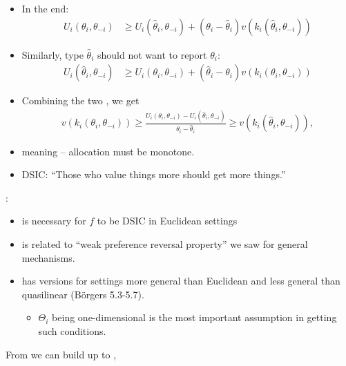 \documentclass[english]{beamer}		%
\def\lyxframeend{} %
\begin{document}
\begin{itemize}
	\item In the end:
	\vspace{-0.5em}\begin{align*}
		U_i(\theta_i, \theta_{-i}) &\geq U_i(\hat{\theta}_i, \theta_{-i}) + \left(\theta_i - \hat{\theta}_i \right) v \left( k_i(\hat{\theta}_i,\theta_{-i}) \right)
	\end{align*}\vspace{-1em}
	\item Similarly, type $\hat{\theta}_i$ should not want to report $\theta_i$:
	\vspace{-0.5em}\begin{align*}
		U_i(\hat{\theta}_i, \theta_{-i}) &\geq U_i(\theta_i, \theta_{-i}) + \left(\hat{\theta}_i - \theta_i \right) v \left( k_i(\theta_i,\theta_{-i}) \right)
	\end{align*}\vspace{-1em}
	\pause
	\item Combining the two , we get
	{\small \vspace{-0.5em}\begin{align*}
		v \left( k_i(\theta_i,\theta_{-i}) \right) 
		\geq 
		\frac{ U_i(\theta_i, \theta_{-i}) - U_i(\hat{\theta}_i, \theta_{-i}) }{ \theta_i - \hat{\theta}_i } 
		\geq 
		v \left( k_i(\hat{\theta}_i,\theta_{-i}) \right),
	\end{align*}\vspace{-1em}}
	\pause
	\item meaning  -- allocation must be \alert{monotone}.
	\item DSIC: ``Those who value things more should get more things.''
	\vspace{-2em}
\end{itemize}
\lyxframeend


:
\begin{itemize}
	\item is necessary for $f$ to be DSIC in Euclidean settings
	\item is related to ``weak preference reversal property'' we saw for general mechanisms.
	\item has versions for settings more general than Euclidean and less general than quasilinear (B{\"o}rgers 5.3-5.7).
	\begin{itemize}
		\item $\Theta_i$ being one-dimensional is the most important assumption in getting such conditions.
	\end{itemize}
\end{itemize}
From  we can build up to , 
\end{document}

